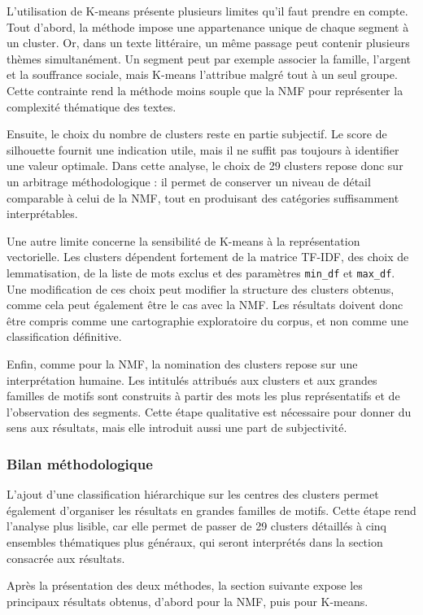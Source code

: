 L'utilisation de K-means présente plusieurs limites qu'il faut prendre en compte. Tout d'abord, la méthode impose une appartenance unique de chaque segment à un cluster. Or, dans un texte littéraire, un même passage peut contenir plusieurs thèmes simultanément. Un segment peut par exemple associer la famille, l'argent et la souffrance sociale, mais K-means l'attribue malgré tout à un seul groupe. Cette contrainte rend la méthode moins souple que la NMF pour représenter la complexité thématique des textes.

Ensuite, le choix du nombre de clusters reste en partie subjectif. Le score de silhouette fournit une indication utile, mais il ne suffit pas toujours à identifier une valeur optimale. Dans cette analyse, le choix de 29 clusters repose donc sur un arbitrage méthodologique : il permet de conserver un niveau de détail comparable à celui de la NMF, tout en produisant des catégories suffisamment interprétables.

Une autre limite concerne la sensibilité de K-means à la représentation vectorielle. Les clusters dépendent fortement de la matrice TF-IDF, des choix de lemmatisation, de la liste de mots exclus et des paramètres \texttt{min\_df} et \texttt{max\_df}. Une modification de ces choix peut modifier la structure des clusters obtenus, comme cela peut également être le cas avec la NMF. Les résultats doivent donc être compris comme une cartographie exploratoire du corpus, et non comme une classification définitive.

Enfin, comme pour la NMF, la nomination des clusters repose sur une interprétation humaine. Les intitulés attribués aux clusters et aux grandes familles de motifs sont construits à partir des mots les plus représentatifs et de l'observation des segments. Cette étape qualitative est nécessaire pour donner du sens aux résultats, mais elle introduit aussi une part de subjectivité.

\subsubsection{Bilan méthodologique}

L'ajout d'une classification hiérarchique sur les centres des clusters permet également d'organiser les résultats en grandes familles de motifs. Cette étape rend l'analyse plus lisible, car elle permet de passer de 29 clusters détaillés à cinq ensembles thématiques plus généraux, qui seront interprétés dans la section consacrée aux résultats.


Après la présentation des deux méthodes, la section suivante expose les principaux résultats obtenus, d'abord pour la NMF, puis pour K-means.